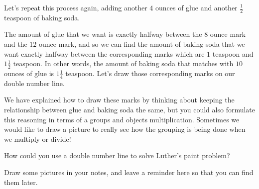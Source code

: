 \documentclass{ximera}
\begin{document}
Let's repeat this process again, adding another $4$ ounces of glue and another $\frac{1}{2}$ teaspoon of baking soda.

\begin{image}
\end{image}

The amount of glue that we want is exactly halfway between the $8$ ounce mark and the $12$ ounce mark, and so we can find the amount of baking soda that we want exactly halfway between the corresponding marks which are $1$ teaspoon and $1 \frac{1}{2}$ teaspoon. In other words, the amount of baking soda that matches with $10$ ounces of glue is $1 \frac{1}{4}$ teaspoon. Let's draw those corresponding marks on our double number line.

\begin{image}
\end{image}

We have explained how to draw these marks by thinking about keeping the relationship between glue and baking soda the same, but you could also formulate this reasoning in terms of a groups and objects multiplication. Sometimes we would like to draw a picture to really see how the grouping is being done when we multiply or divide!

\begin{question}
How could you use a double number line to solve Luther's paint problem?
\begin{freeResponse}
Draw some pictures in your notes, and leave a reminder here so that you can find them later.
\end{freeResponse}
\end{question}
\end{document}
